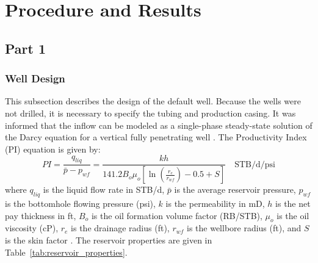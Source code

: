 
\chapter{Procedure and Results}

\section{Part 1}
\label{sec:proc_part1}
\subsection{Well Design}
\label{subsec:well}
This subsection describes the design of the default well. Because the wells were
not drilled, it is necessary to specify the tubing and production casing.
It was informed that the inflow can be modeled as a single-phase steady-state
solution of the Darcy equation for a vertical fully penetrating well
\cite{lee_pressure_2003}. The Productivity Index (PI) equation is given by:
\begin{equation}
    PI = \frac{q_{liq}}{\bar{p} - p_{wf}} = \frac{kh}{141.2 B_o \mu_o
    \left[\ln{\left(\frac{r_e}{r_{wf}}\right)}-0.5 + S\right]}
    \quad \text{STB/d/psi}
\end{equation}
where $q_{liq}$ is the liquid flow rate in STB/d, $\bar{p}$ is the average
reservoir pressure, $p_{wf}$ is the bottomhole flowing pressure (psi), $k$ is
the permeability in mD, $h$ is the net pay thickness in ft, $B_o$ is the oil
formation volume factor (RB/STB), $\mu_o$ is the oil viscosity (cP), $r_e$ is
the drainage radius (ft), $r_{wf}$ is the wellbore radius (ft), and $S$ is the
skin factor \cite{lee_pressure_2003}.
The reservoir properties are given in Table~\ref{tab:reservoir_properties}.

